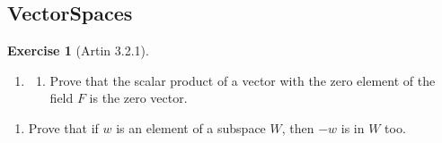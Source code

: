 \documentclass[
]{book}
\providecommand{\tightlist}{%
  \setlength{\itemsep}{0pt}\setlength{\parskip}{0pt}}
\theoremstyle{definition}
\theoremstyle{definition}
\theoremstyle{definition}
\newtheorem{exercise}{Exercise}[chapter]
\theoremstyle{definition}
\theoremstyle{remark}
\begin{document}
\hypertarget{vectorspaces}{%
\subsection{VectorSpaces}\label{vectorspaces}}

\begin{exercise}[Artin 3.2.1]
\protect\hypertarget{exr:unnamed-chunk-276}{}\label{exr:unnamed-chunk-276}\leavevmode

\begin{enumerate}
\def\labelenumi{\arabic{enumi}.}
\setcounter{enumi}{1}
\item
  \begin{enumerate}
  \def\labelenumii{(\alph{enumii})}
  \tightlist
  \item
    Prove that the scalar product of a vector with the zero element of the field \(F\) is the zero vector.
  \end{enumerate}
\end{enumerate}

\begin{enumerate}
\def\labelenumi{(\alph{enumi})}
\setcounter{enumi}{1}
\tightlist
\item
  Prove that if \(w\) is an element of a subspace \(W\), then \(-w\) is in \(W\) too.
\end{enumerate}

\end{exercise}
\end{document}
